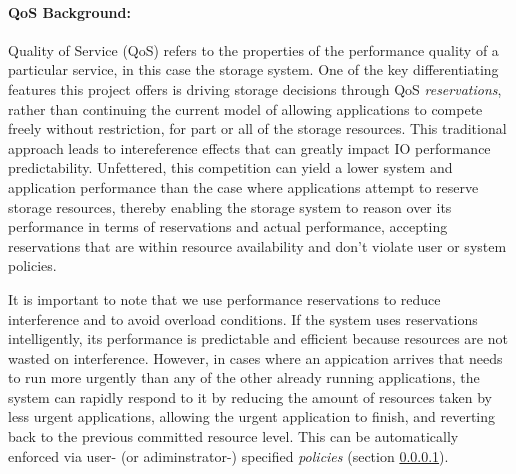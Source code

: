 \paragraph{QoS Background:} 
Quality of Service (QoS) refers to the
properties of the performance quality of a particular service, in
this case the storage system.
One of the key differentiating features this project offers is driving storage
decisions through QoS \emph{reservations}, rather than continuing the current model
of allowing applications to compete freely without restriction, for part or all of the storage
resources. This traditional approach leads to intereference effects
\cite{lofstead:2010:adaptive,liu_hotstorage} that can greatly impact IO performance predictability. 
Unfettered, this competition can yield a lower system and application performance 
than the case where applications attempt to reserve storage resources, thereby enabling the storage system
to reason over its performance in terms of reservations and actual
performance, accepting reservations that are within resource
availability and don't violate user or system policies.

It is important to note that we use performance reservations to
reduce interference and to avoid overload conditions. If the system
uses reservations intelligently, its performance is predictable and
efficient because resources are not wasted on interference. However,
in cases where an appication arrives that needs to run more urgently
than any of the other already running applications, the system
can rapidly respond to it by reducing the amount of resources taken 
by less urgent applications, allowing the urgent application to finish,
and reverting back to the previous committed resource level. This can
be automatically enforced via user- (or adiminstrator-) specified \textit{policies}
(section \ref{}).


